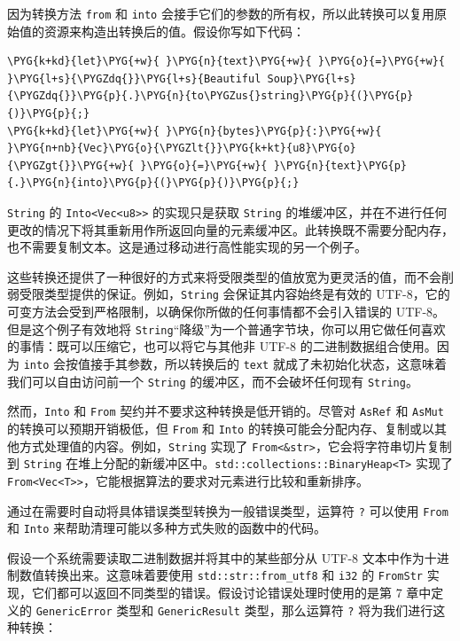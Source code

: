 因为转换方法 \texttt{from} 和 \texttt{into} 会接手它们的参数的所有权，所以此转换可以复用原始值的资源来构造出转换后的值。假设你写如下代码：

\begin{Verbatim}[commandchars=\\\{\},breaklines=true,breakanywhere=true,fontsize=\codefont,xleftmargin=17bp]
\PYG{k+kd}{let}\PYG{+w}{ }\PYG{n}{text}\PYG{+w}{ }\PYG{o}{=}\PYG{+w}{ }\PYG{l+s}{\PYGZdq{}}\PYG{l+s}{Beautiful Soup}\PYG{l+s}{\PYGZdq{}}\PYG{p}{.}\PYG{n}{to\PYGZus{}string}\PYG{p}{(}\PYG{p}{)}\PYG{p}{;}
\PYG{k+kd}{let}\PYG{+w}{ }\PYG{n}{bytes}\PYG{p}{:}\PYG{+w}{ }\PYG{n+nb}{Vec}\PYG{o}{\PYGZlt{}}\PYG{k+kt}{u8}\PYG{o}{\PYGZgt{}}\PYG{+w}{ }\PYG{o}{=}\PYG{+w}{ }\PYG{n}{text}\PYG{p}{.}\PYG{n}{into}\PYG{p}{(}\PYG{p}{)}\PYG{p}{;}
\end{Verbatim}

\texttt{String} 的 \texttt{Into<Vec<u8>>} 的实现只是获取 \texttt{String} 的堆缓冲区，并在不进行任何更改的情况下将其重新用作所返回向量的元素缓冲区。此转换既不需要分配内存，也不需要复制文本。这是通过移动进行高性能实现的另一个例子。

这些转换还提供了一种很好的方式来将受限类型的值放宽为更灵活的值，而不会削弱受限类型提供的保证。例如，\texttt{String} 会保证其内容始终是有效的 UTF-8，它的可变方法会受到严格限制，以确保你所做的任何事情都不会引入错误的 UTF-8。但是这个例子有效地将 \texttt{String}“降级”为一个普通字节块，你可以用它做任何喜欢的事情：既可以压缩它，也可以将它与其他非 UTF-8 的二进制数据组合使用。因为 \texttt{into} 会按值接手其参数，所以转换后的 \texttt{text} 就成了未初始化状态，这意味着我们可以自由访问前一个 \texttt{String} 的缓冲区，而不会破坏任何现有 \texttt{String}。

然而，\texttt{Into} 和 \texttt{From} 契约并不要求这种转换是低开销的。尽管对 \texttt{AsRef} 和 \texttt{AsMut} 的转换可以预期开销极低，但 \texttt{From} 和 \texttt{Into} 的转换可能会分配内存、复制或以其他方式处理值的内容。例如，\texttt{String} 实现了 \texttt{From<\&str>}，它会将字符串切片复制到 \texttt{String} 在堆上分配的新缓冲区中。\texttt{std::collections::BinaryHeap<T>} 实现了 \texttt{From<Vec<T>>}，它能根据算法的要求对元素进行比较和重新排序。

通过在需要时自动将具体错误类型转换为一般错误类型，运算符 \texttt{?} 可以使用 \texttt{From} 和 \texttt{Into} 来帮助清理可能以多种方式失败的函数中的代码。

假设一个系统需要读取二进制数据并将其中的某些部分从 UTF-8 文本中作为十进制数值转换出来。这意味着要使用 \texttt{std::str::from\_utf8} 和 \texttt{i32} 的 \texttt{FromStr} 实现，它们都可以返回不同类型的错误。假设讨论错误处理时使用的是第 7 章中定义的 \texttt{GenericError} 类型和 \texttt{GenericResult} 类型，那么运算符 \texttt{?} 将为我们进行这种转换：

